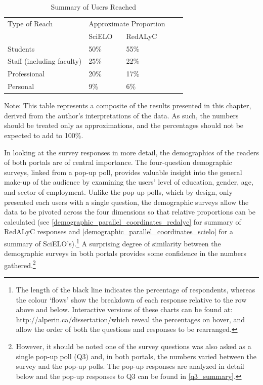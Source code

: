 \begin{table}[!htbp]
\centering
\caption{Summary of Users Reached} \label{reach_summary}
\begin{threeparttable}
\begin{tabular}{@{}lllll@{}}
\toprule
Type of Reach     &\multicolumn{2}{c}{Approximate Proportion} \\ \cmidrule{2-3}
    &   SciELO  &   RedALyC \\ \midrule
Students    &   50\%    &   55\%    \\
Staff (including faculty)   &   25\%    &   22\%    \\
Professional    &   20\%    &   17\%    \\
Personal    &   9\% &   6\% \\ \bottomrule
\end{tabular}
\begin{tablenotes}
\small
\item Note: This table represents a composite of the results presented in this chapter, derived from the author's interpretations of the data. As such, the numbers should be treated only as approximations, and the percentages should not be expected to add to 100\%.
\end{tablenotes}
\end{threeparttable}
\end{table}



In looking at the survey responses in more detail, the demographics of the readers of both portals are of central importance. The four-question demographic surveys, linked from a pop-up poll, provides valuable insight into the general make-up of the audience by examining the users' level of education, gender, age, and sector of employment. Unlike the pop-up polls, which by design, only presented each users with a single question, the demographic surveys allow the data to be pivoted across the four dimensions so that relative proportions can be calculated (see \autoref{demographic_parallel_coordinates_redalyc} for summary of RedALyC responses and \autoref{demographic_parallel_coordinates_scielo} for a summary of SciELO's).\footnote{The length of the black line indicates the percentage of respondents, whereas the colour `flows' show the breakdown of each response relative to the row above and below. Interactive versions of these charts can be found at: http:\slash \slash alperin.ca\slash dissertation\slash  which reveal the percentages on hover, and allow the order of both the questions and responses to be rearranged.} A surprising degree of similarity between the demographic surveys in both portals provides some confidence in the numbers gathered.\footnote{However, it should be noted one of the survey questions was also asked as a single pop-up poll (Q3) and, in both portals, the numbers varied between the survey and the pop-up polls. The pop-up responses are analyzed in detail below and the pop-up responses to Q3 can be found in \autoref{q3_summary}.}

